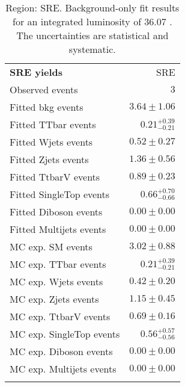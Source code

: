 

\begin{table}
\begin{center}
\setlength{\tabcolsep}{0.0pc}
{\small
\begin{tabular*}{\textwidth}{@{\extracolsep{\fill}}lr}
\noalign{\smallskip}\hline\noalign{\smallskip}
{\bf SRE yields}           & SRE              \\[-0.05cm]
\noalign{\smallskip}\hline\noalign{\smallskip}
Observed events          & $3$                    \\
\noalign{\smallskip}\hline\noalign{\smallskip}
Fitted bkg events         & $3.64 \pm 1.06$              \\
\noalign{\smallskip}\hline\noalign{\smallskip}
        Fitted TTbar events         & $0.21_{-0.21}^{+0.39}$              \\
        Fitted Wjets events         & $0.52 \pm 0.27$              \\
        Fitted Zjets events         & $1.36 \pm 0.56$              \\
        Fitted TtbarV events         & $0.89 \pm 0.23$              \\
        Fitted SingleTop events         & $0.66_{-0.66}^{+0.70}$              \\
        Fitted Diboson events         & $0.00 \pm 0.00$              \\
        Fitted Multijets events         & $0.00 \pm 0.00$              \\
 \noalign{\smallskip}\hline\noalign{\smallskip}
MC exp. SM events              & $3.02 \pm 0.88$              \\
\noalign{\smallskip}\hline\noalign{\smallskip}
        MC exp. TTbar events         & $0.21_{-0.21}^{+0.39}$              \\
        MC exp. Wjets events         & $0.42 \pm 0.20$              \\
        MC exp. Zjets events         & $1.15 \pm 0.45$              \\
        MC exp. TtbarV events         & $0.69 \pm 0.16$              \\
        MC exp. SingleTop events         & $0.56_{-0.56}^{+0.57}$              \\
        MC exp. Diboson events         & $0.00 \pm 0.00$              \\
        MC exp. Multijets events         & $0.00 \pm 0.00$              \\
\noalign{\smallskip}\hline\noalign{\smallskip}
\end{tabular*}
}
\end{center}
\caption{Region: SRE. Background-only fit results for an integrated luminosity of 36.07 \ifb. The uncertainties are statistical and systematic.
}
\label{table.bkgonly.SRE}
\end{table}
%